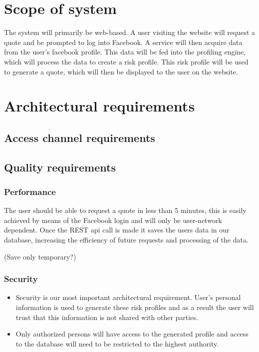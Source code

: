 \documentclass{article}
\begin{document}
\section{Scope of system}
The system will primarily be web-based. A user visiting the website will request a quote and be prompted to log into Facebook. A service will then acquire data from the user’s facebook profile. This data will be fed into the profiling engine, which will process the data to create a risk profile. This risk profile will be used to generate a quote, which will then be displayed to the user on the website.

\section{Architectural requirements}
	\subsection{Access channel requirements}
	
	\subsection{Quality requirements}
		\subsubsection{Performance}
		The user should be able to request a quote in less than 5 minutes, this is easily achieved by means of the Facebook login and will only be user-network dependent. Once the REST api call is made it saves the users data in our database, increasing the efficiency of future requests and processing of the data.
		
		(Save only temporary?)
		\subsubsection{Security}
		\begin{itemize}
			\item Security is our most important architectural requirement. User's personal information is used to generate these risk profiles and as a result the user will trust that this information is not shared with other parties.
			\item Only authorized persons will have access to the generated profile and access to the database will need to be restricted to the highest authority.
		\end{itemize}
\end{document}
